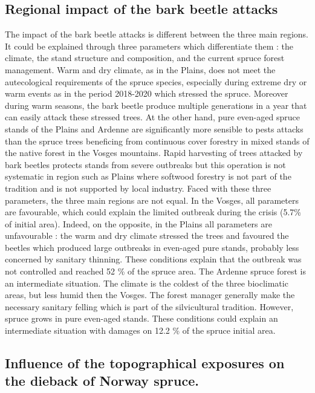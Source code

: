 \documentclass[3p,procedia]{elsarticle}
\begin{document}
\subsection{Regional impact of the bark beetle attacks}
The  impact of the bark beetle attacks is different between the three main regions.
It could be explained through three parameters which differentiate them : the climate, the stand structure and composition, and the current spruce forest management.
Warm and dry climate, as in the Plains, does not meet the autecological requirements of the spruce species, especially during extreme dry or warm events as in the period 2018-2020 \citep{rousi_accelerated_2022} which stressed the spruce. Moreover during warm seasons, the bark beetle produce multiple generations in a year \citep{annila_influence_1969,baier_phenipscomprehensive_2007} that can easily attack these stressed trees.
At the other hand, pure even-aged spruce stands of the Plains and Ardenne are significantly more sensible to pests attacks \citep{faccoli_composition_2014,jactel_2021} than the spruce trees beneficing from continuous cover forestry in mixed stands of the native forest in the Vosges mountains.
Rapid harvesting of trees attacked by bark beetles protects stands from severe outbreaks \citep{stadelmann_effects_2013} but this operation is not systematic in region such as Plains where softwood forestry is not part of the tradition and is not supported by local industry.
Faced with these three parameters, the three main regions are not equal.
In the Vosges, all parameters are favourable, which could explain the limited outbreak during the crisis (5.7\% of initial area).
Indeed, on the opposite, in the Plains all parameters are unfavourable : the warm and dry climate stressed the trees and favoured the beetles which produced large outbreaks in even-aged pure stands, probably less concerned by sanitary thinning. 
These conditions explain that the outbreak was not controlled and reached 52 \% of the spruce area.
The Ardenne spruce forest is an intermediate situation.
The climate is the coldest of the three bioclimatic areas, but less humid then the Vosges.
The forest manager generally make the necessary sanitary felling which is part of the silvicultural tradition.
However, spruce grows in pure even-aged stands.
These conditions could explain an intermediate situation with damages on 12.2 \% of the spruce initial area.


\subsection{Influence of the topographical exposures on the dieback of Norway spruce.}
\end{document}

